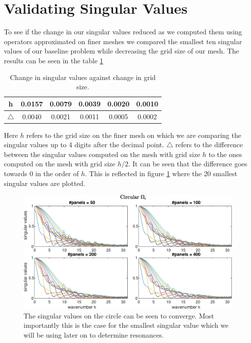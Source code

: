 \documentclass[a4paper, oneside]{discothesis}
\begin{document}
\section{Validating Singular Values} \label{sec:valsv}
To see if the change in our singular values reduced as we computed them using operators approximated on finer meshes we compared the smallest ten singular values of our baseline problem while decreasing the grid size of our mesh.
The results can be seen in the table \ref{tbl:sv}
\begin{table}[h!]
	\centering
	\begin{tabular}{ |c|c|c|c|c|c| } 
		\hline
		h & 0.0157 & 0.0079 & 0.0039 & 0.0020 & 0.0010 \\ 
		\hline
		$\bigtriangleup$ & 0.0040 & 0.0021 & 0.0011 & 0.0005 & 0.0002 \\ 
		\hline
	\end{tabular}
	\caption{Change in singular values against change in grid size.}
	\label{tbl:sv}
\end{table}
Here $h$ refers to the grid size on the finer mesh on which we are comparing the singular values up to 4 digits after the decimal point.
$\bigtriangleup$ refers to the difference between the singular values computed on the mesh with grid size $h$ to the ones computed on the mesh with grid size $h/2$.
It can be seen that the difference goes towards $0$ in the order of $h$.
This is reflected in figure \ref{fig:SVs_circle} where the 20 smallest singular values are plotted.
\begin{figure} [!ht]
	\centering
	\includegraphics[width=\columnwidth]{figures/SVs_circle.eps}
	\caption{ The singular values on the circle can be seen to converge. 
	Most importantly this is the case for the smallest singular value which we will be using later on to determine resonances.}
	\label{fig:SVs_circle}
\end{figure}
\end{document}
